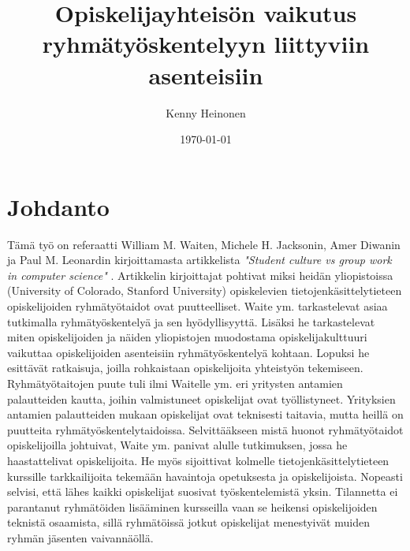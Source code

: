 \documentclass[finnish]{../tktltiki2}
\title{Opiskelijayhteisön vaikutus ryhmätyöskentelyyn liittyviin asenteisiin}
\author{Kenny Heinonen}
\date{\today}
\theoremstyle{definition}
\theoremstyle{remark}
\begin{document}

\maketitle        %
\makeabstract     %

\tableofcontents  %
\newpage          %



\section{Johdanto}



Tämä työ on referaatti William M. Waiten, Michele H. Jacksonin, Amer Diwanin ja Paul M. Leonardin kirjoittamasta artikkelista \emph{"Student culture vs group work in computer science"} \cite{Waite:2004:SCV:1028174.971308}.
Artikkelin kirjoittajat pohtivat miksi heidän yliopistoissa (University of Colorado, Stanford University) opiskelevien tietojenkäsittelytieteen opiskelijoiden ryhmätyötaidot ovat puutteelliset. Waite ym. tarkastelevat asiaa tutkimalla ryhmätyöskentelyä ja sen hyödyllisyyttä. Lisäksi he tarkastelevat miten opiskelijoiden ja näiden yliopistojen muodostama opiskelijakulttuuri vaikuttaa opiskelijoiden asenteisiin ryhmätyöskentelyä kohtaan. Lopuksi he esittävät ratkaisuja, joilla rohkaistaan opiskelijoita yhteistyön tekemiseen.\\

Ryhmätyötaitojen puute tuli ilmi Waitelle ym. eri yritysten antamien palautteiden kautta, joihin valmistuneet opiskelijat ovat työllistyneet. Yrityksien antamien palautteiden mukaan opiskelijat ovat teknisesti taitavia, mutta heillä on puutteita ryhmätyöskentelytaidoissa. Selvittääkseen mistä huonot ryhmätyötaidot opiskelijoilla johtuivat, Waite ym. panivat alulle tutkimuksen, jossa he haastattelivat opiskelijoita. He myös sijoittivat kolmelle tietojenkäsittelytieteen kurssille tarkkailijoita tekemään havaintoja opetuksesta ja opiskelijoista. Nopeasti selvisi, että lähes kaikki opiskelijat suosivat työskentelemistä yksin. Tilannetta ei parantanut ryhmätöiden lisääminen kursseilla vaan se heikensi opiskelijoiden teknistä osaamista, sillä ryhmätöissä jotkut opiskelijat menestyivät muiden ryhmän jäsenten vaivannäöllä.
\end{document}
